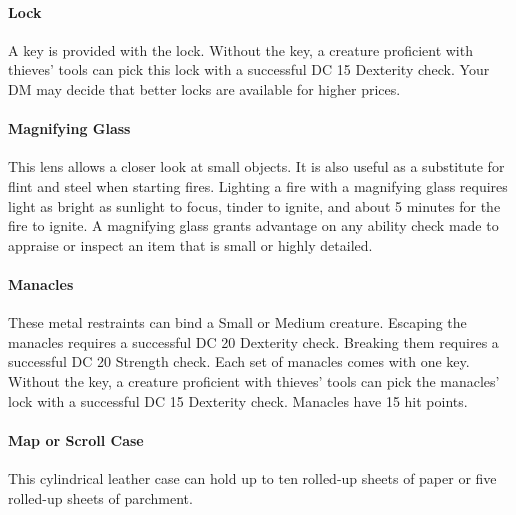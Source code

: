     \paragraph{Lock}
        A key is provided with the lock.
        Without the key, a creature proficient with thieves' tools can pick this lock with a successful DC 15 Dexterity check.
        Your DM may decide that better locks are available for higher prices.
    \paragraph{Magnifying Glass}
        This lens allows a closer look at small objects.
        It is also useful as a substitute for flint and steel when starting fires.
        Lighting a fire with a magnifying glass requires light as bright as sunlight to focus, tinder to ignite, and about 5 minutes for the fire to ignite.
        A magnifying glass grants advantage on any ability check made to appraise or inspect an item that is small or highly detailed.
    \paragraph{Manacles}
        These metal restraints can bind a Small or Medium creature.
        Escaping the manacles requires a successful DC 20 Dexterity check.
        Breaking them requires a successful DC 20 Strength check.
        Each set of manacles comes with one key.
        Without the key, a creature proficient with thieves' tools can pick the manacles' lock with a successful DC 15 Dexterity check.
        Manacles have 15 hit points.
    \paragraph{Map or Scroll Case}
        This cylindrical leather case can hold up to ten rolled-up sheets of paper or five rolled-up sheets of parchment.

